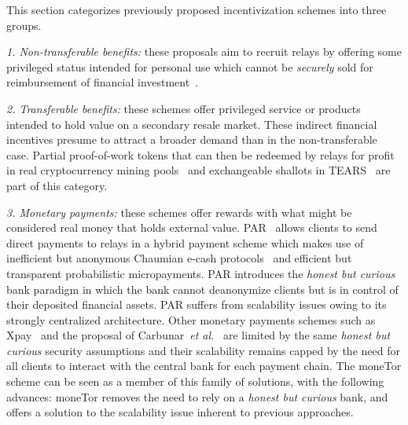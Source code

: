 This section categorizes previously proposed incentivization schemes into three
groups.

\noindent \emph{1. Non-transferable benefits:} these proposals aim to recruit
relays by offering some privileged status intended for personal use which cannot
be \emph{securely} sold for reimbursement of financial
investment~\cite{dingledine2010building,jansen2010recruiting, jansen2013lira}.
	  
\noindent \emph{2. Transferable benefits:} these schemes offer privileged
service or products intended to hold value on a secondary resale market. These
indirect financial incentives presume to attract a broader demand than in the
non-transferable case. Partial proof-of-work tokens that can then be redeemed by
relays for profit in real cryptocurrency mining pools~\cite{biryukov2015proof}
and exchangeable shallots in TEARS~\cite{jansen2014onions} are part of this
category.

\noindent \emph{3. Monetary payments:} these schemes offer rewards with what
might be considered real money that holds external value.
PAR~\cite{androulaki2008payment} allows clients to send direct payments to
relays in a hybrid payment scheme which makes use of inefficient but anonymous
Chaumian e-cash protocols~\cite{chaum1988untraceable} and efficient but
transparent probabilistic micropayments. PAR introduces the \emph{honest but
  curious} bank paradigm in which the bank cannot deanonymize clients but is in
control of their deposited financial assets. PAR suffers from scalability issues
owing to its strongly centralized architecture. Other monetary payments schemes
such as Xpay~\cite{chen2009xpay} and the proposal of Carbunar~\textit{et
  al.}~\cite{carbunar2012tipping} are limited by the same \emph{honest but
  curious} security assumptions and their scalability remains capped by the need
for all clients to interact with the central bank for each payment chain. The
moneTor scheme can be seen as a member of this family of solutions, with the
following advances: moneTor removes the need to rely on a \textit{honest but
  curious} bank, and offers a solution to the scalability issue inherent to
previous approaches.



